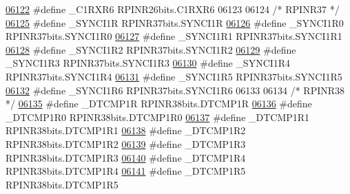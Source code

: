 \begin{DoxyCode}
\hypertarget{a00009_source_l06122}{}\hyperlink{a00009_a4cd0a47a78c917733ea2e97f0e0a6bfa}{06122} \textcolor{preprocessor}{#define \_C1RXR6 RPINR26bits.C1RXR6}
06123 
06124 \textcolor{comment}{/* RPINR37 */}
\hypertarget{a00009_source_l06125}{}\hyperlink{a00009_afe32a37a626f276f6e23e90cde184694}{06125} \textcolor{preprocessor}{#define \_SYNCI1R RPINR37bits.SYNCI1R}
\hypertarget{a00009_source_l06126}{}\hyperlink{a00009_a3ce07046f4b59ed5f86a23f689589dea}{06126} \textcolor{preprocessor}{#define \_SYNCI1R0 RPINR37bits.SYNCI1R0}
\hypertarget{a00009_source_l06127}{}\hyperlink{a00009_a6604ecdf70baa2f764ef29d5ece374b0}{06127} \textcolor{preprocessor}{#define \_SYNCI1R1 RPINR37bits.SYNCI1R1}
\hypertarget{a00009_source_l06128}{}\hyperlink{a00009_a83666848783b0acb4020d4ef18c70cfa}{06128} \textcolor{preprocessor}{#define \_SYNCI1R2 RPINR37bits.SYNCI1R2}
\hypertarget{a00009_source_l06129}{}\hyperlink{a00009_aef4ba5b38e330473e0f3656107518e26}{06129} \textcolor{preprocessor}{#define \_SYNCI1R3 RPINR37bits.SYNCI1R3}
\hypertarget{a00009_source_l06130}{}\hyperlink{a00009_a5a127d957bb04aa0e37b822bb0a83341}{06130} \textcolor{preprocessor}{#define \_SYNCI1R4 RPINR37bits.SYNCI1R4}
\hypertarget{a00009_source_l06131}{}\hyperlink{a00009_ae92c7c035a1f9696f3d6a261c5f8b516}{06131} \textcolor{preprocessor}{#define \_SYNCI1R5 RPINR37bits.SYNCI1R5}
\hypertarget{a00009_source_l06132}{}\hyperlink{a00009_aba0776a7058bfc81401ce53db4354258}{06132} \textcolor{preprocessor}{#define \_SYNCI1R6 RPINR37bits.SYNCI1R6}
06133 
06134 \textcolor{comment}{/* RPINR38 */}
\hypertarget{a00009_source_l06135}{}\hyperlink{a00009_a428a27714a683b80d197c124ec452e71}{06135} \textcolor{preprocessor}{#define \_DTCMP1R RPINR38bits.DTCMP1R}
\hypertarget{a00009_source_l06136}{}\hyperlink{a00009_aaf08a4d30760c884edf002a7e8a27a2b}{06136} \textcolor{preprocessor}{#define \_DTCMP1R0 RPINR38bits.DTCMP1R0}
\hypertarget{a00009_source_l06137}{}\hyperlink{a00009_afcfef3f8922acaef541295ab5ac46a97}{06137} \textcolor{preprocessor}{#define \_DTCMP1R1 RPINR38bits.DTCMP1R1}
\hypertarget{a00009_source_l06138}{}\hyperlink{a00009_a41aa59af1cfa926a774ce536cb71d067}{06138} \textcolor{preprocessor}{#define \_DTCMP1R2 RPINR38bits.DTCMP1R2}
\hypertarget{a00009_source_l06139}{}\hyperlink{a00009_ac0340b6b43f7a38fd03f29a60eb9a98c}{06139} \textcolor{preprocessor}{#define \_DTCMP1R3 RPINR38bits.DTCMP1R3}
\hypertarget{a00009_source_l06140}{}\hyperlink{a00009_a0d9e6217b3701a3d92c688adf4b71144}{06140} \textcolor{preprocessor}{#define \_DTCMP1R4 RPINR38bits.DTCMP1R4}
\hypertarget{a00009_source_l06141}{}\hyperlink{a00009_aaf10c3fbae4e5ebcba86bd7df69307a9}{06141} \textcolor{preprocessor}{#define \_DTCMP1R5 RPINR38bits.DTCMP1R5}

\end{DoxyCode}
